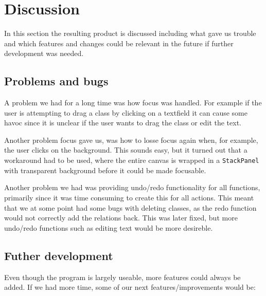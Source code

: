 \section{Discussion}
In this section the resulting product is discussed including what gave us trouble and
which features and changes could be relevant in the future if further
development was needed.

\subsection{Problems and bugs}
A problem we had for a long time was how focus was handled. For example if the
user is attempting to drag a class by clicking on a textfield it can cause some
havoc since it is unclear if the user wants to drag the class or edit the text. 

Another problem focus gave us, was how to losse focus again when, for example, 
the
user clicks on the background. This sounds easy, but it turned out that a
workaround had to be used, where the entire canvas is wrapped in a
\texttt{StackPanel} with transparent background before it could be made
focusable.

Another problem we had was providing undo/redo functionality for all functions,
primarily since it was time consuming to create this for all actions. This meant
that we at some point had some bugs with deleting classes, as the redo function
would not correctly add the relations back. This was later fixed, but more
undo/redo functions such as editing text would be more desireble. 

\subsection{Futher development}
Even though the program is largely useable, more features could always be added.
If we had more time, some of our next features/improvements would be:

